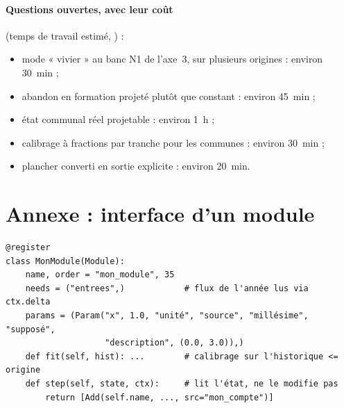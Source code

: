 \documentclass[11pt]{article}
\begin{document}
\paragraph{Questions ouvertes, avec leur coût} (temps de travail estimé, \suppose) :
\begin{itemize}
  \item mode « vivier » au banc N1 de l'axe~3, sur plusieurs origines : environ 30~min ;
  \item abandon en formation projeté plutôt que constant : environ 45~min ;
  \item état communal réel projetable : environ 1~h ;
  \item calibrage à fractions par tranche pour les communes : environ 30~min ;
  \item plancher converti en sortie explicite : environ 20~min.
\end{itemize}




\appendix
\section{Annexe : interface d'un module}
\begin{verbatim}
@register
class MonModule(Module):
    name, order = "mon_module", 35
    needs = ("entrees",)            # flux de l'année lus via ctx.delta
    params = (Param("x", 1.0, "unité", "source", "millésime", "supposé",
                    "description", (0.0, 3.0)),)
    def fit(self, hist): ...        # calibrage sur l'historique <= origine
    def step(self, state, ctx):     # lit l'état, ne le modifie pas
        return [Add(self.name, ..., src="mon_compte")]
\end{verbatim}
\end{document}
